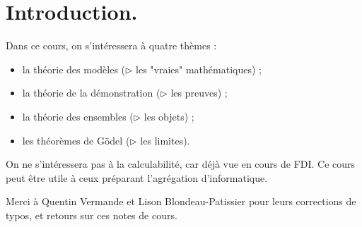 \documentclass[./main]{subfiles}
\begin{document}
  \chapter*{Introduction.} 

  Dans ce cours, on s'intéressera à quatre thèmes :
  \begin{itemize}
    \item la théorie des modèles ($\triangleright$ les "vraies" mathématiques) ;
    \item la théorie de la démonstration ($\triangleright$ les preuves) ;
    \item la théorie des ensembles ($\triangleright$ les objets) ;
    \item les théorèmes de Gödel ($\triangleright$ les limites).
  \end{itemize}
  On ne s'intéressera pas à la calculabilité, car déjà vue en cours de FDI.
  Ce cours peut être utile à ceux préparant l'agrégation d'informatique.


  \begin{note}
    Merci à Quentin Vermande et Lison Blondeau-Patissier pour leurs corrections de typos, et retours sur ces notes de cours.
  \end{note}
\end{document}

